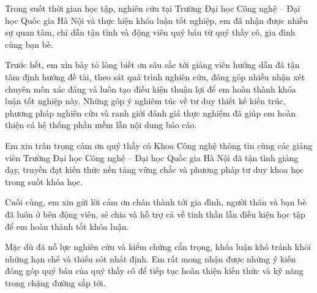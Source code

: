 
Trong suốt thời gian học tập, nghiên cứu tại Trường Đại học Công nghệ -- Đại học Quốc gia Hà Nội và thực hiện khóa luận tốt nghiệp, em đã nhận được nhiều sự quan tâm, chỉ dẫn tận tình và động viên quý báu từ quý thầy cô, gia đình cùng bạn bè.

Trước hết, em xin bày tỏ lòng biết ơn sâu sắc tới giảng viên hướng dẫn đã tận tâm định hướng đề tài, theo sát quá trình nghiên cứu, đóng góp nhiều nhận xét chuyên môn xác đáng và luôn tạo điều kiện thuận lợi để em hoàn thành khóa luận tốt nghiệp này. Những góp ý nghiêm túc về tư duy thiết kế kiến trúc, phương pháp nghiên cứu và ranh giới đánh giá thực nghiệm đã giúp em hoàn thiện cả hệ thống phần mềm lẫn nội dung báo cáo.

Em xin trân trọng cảm ơn quý thầy cô Khoa Công nghệ thông tin cùng các giảng viên Trường Đại học Công nghệ -- Đại học Quốc gia Hà Nội đã tận tình giảng dạy, truyền đạt kiến thức nền tảng vững chắc và phương pháp tư duy khoa học trong suốt khóa học.

Cuối cùng, em xin gửi lời cảm ơn chân thành tới gia đình, người thân và bạn bè đã luôn ở bên động viên, sẻ chia và hỗ trợ cả về tinh thần lẫn điều kiện học tập để em hoàn thành tốt khóa luận.

Mặc dù đã nỗ lực nghiên cứu và kiểm chứng cẩn trọng, khóa luận khó tránh khỏi những hạn chế và thiếu sót nhất định. Em rất mong nhận được những ý kiến đóng góp quý báu của quý thầy cô để tiếp tục hoàn thiện kiến thức và kỹ năng trong chặng đường sắp tới.
